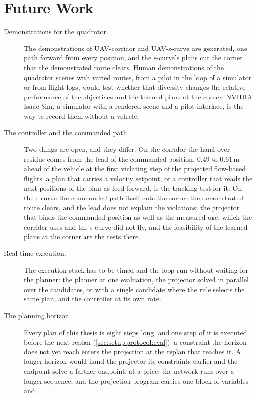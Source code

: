 \section{Future Work}\label{sec:disc:future}

\begin{description}
  \item[Demonstrations for the quadrotor.] The demonstrations of UAV-corridor and UAV-s-curve are
    generated, one path forward from every position, and the s-curve's plans cut the corner that the
    demonstrated route clears. Human demonstrations of the quadrotor scenes with varied routes, from a
    pilot in the loop of a simulator or from flight logs, would test whether that diversity changes
    the relative performance of the objectives and the learned plans at the corner; NVIDIA Isaac Sim,
    a simulator with a rendered scene and a pilot interface, is the way to record them without a
    vehicle.
  \item[The controller and the commanded path.] Two things are open, and they differ. On the corridor
    the hand-over residue comes from the lead of the commanded position, $0.49$ to $0.61$\,m ahead of
    the vehicle at the first violating step of the projected flow-based flights; a plan that carries a
    velocity setpoint, or a controller that reads the next positions of the plan as feed-forward, is
    the tracking test for it. On the s-curve the commanded path itself cuts the corner the
    demonstrated route clears, and the lead does not explain the violations; the projector that binds
    the commanded position as well as the measured one, which the corridor uses and the s-curve did
    not fly, and the feasibility of the learned plans at the corner are the tests there.
  \item[Real-time execution.] The execution stack has to be timed and the loop run without waiting for
    the planner: the planner at one evaluation, the projector solved in parallel over the candidates,
    or with a single candidate where the rule selects the same plan, and the controller at its own rate.
  \item[The planning horizon.] Every plan of this thesis is eight steps long, and one step of it is
    executed before the next replan (\autoref{sec:setup:protocol:eval}); a constraint the horizon does
    not yet reach enters the projection at the replan that reaches it. A longer horizon would hand the
    projector its constraints earlier and the endpoint solve a farther endpoint, at a price: the
    network runs over a longer sequence, and the projection program carries one block of variables and

\end{description}
